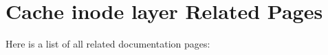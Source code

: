 \section{Cache inode layer Related Pages}
Here is a list of all related documentation pages:\begin{CompactList}
\item {}

\end{CompactList}
